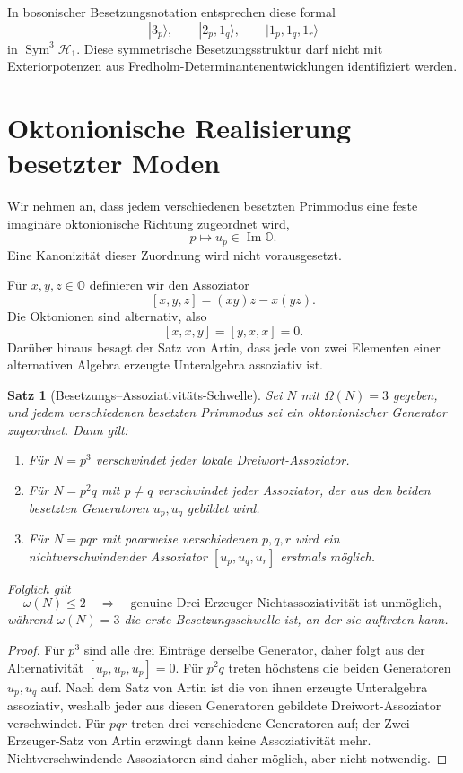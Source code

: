 \documentclass[11pt,a4paper]{article}
\newtheorem{theorem}{Satz}[section]
\theoremstyle{definition}
\theoremstyle{remark}
\newcommand{\OO}{\mathbb O}
\newcommand{\Sym}{\operatorname{Sym}}
\begin{document}
In bosonischer Besetzungsnotation entsprechen diese formal
\[
|3_p\rangle,\qquad |2_p,1_q\rangle,\qquad |1_p,1_q,1_r\rangle
\]
in $\Sym^3\mathcal H_1$. Diese symmetrische Besetzungsstruktur darf nicht mit Exteriorpotenzen aus Fredholm-Determinantenentwicklungen identifiziert werden.

\section{Oktonionische Realisierung besetzter Moden}
Wir nehmen an, dass jedem verschiedenen besetzten Primmodus eine feste imaginäre oktonionische Richtung zugeordnet wird,
\[
p\longmapsto u_p\in\operatorname{Im}\OO.
\]
Eine Kanonizität dieser Zuordnung wird nicht vorausgesetzt.

Für $x,y,z\in\OO$ definieren wir den Assoziator
\[
[x,y,z]=(xy)z-x(yz).
\]
Die Oktonionen sind alternativ, also
\[
[x,x,y]=[y,x,x]=0.
\]
Darüber hinaus besagt der Satz von Artin, dass jede von zwei Elementen einer alternativen Algebra erzeugte Unteralgebra assoziativ ist.

\begin{theorem}[Besetzungs--Assoziativitäts-Schwelle]\label{thm:threshold}
Sei $N$ mit $\Omega(N)=3$ gegeben, und jedem verschiedenen besetzten Primmodus sei ein oktonionischer Generator zugeordnet. Dann gilt:
\begin{enumerate}[label=(\roman*)]
\item Für $N=p^3$ verschwindet jeder lokale Dreiwort-Assoziator.
\item Für $N=p^2q$ mit $p\ne q$ verschwindet jeder Assoziator, der aus den beiden besetzten Generatoren $u_p,u_q$ gebildet wird.
\item Für $N=pqr$ mit paarweise verschiedenen $p,q,r$ wird ein nichtverschwindender Assoziator $[u_p,u_q,u_r]$ erstmals möglich.
\end{enumerate}
Folglich gilt
\[
\omega(N)\le2
\quad\Longrightarrow\quad
\text{genuine Drei-Erzeuger-Nichtassoziativität ist unmöglich},
\]
während $\omega(N)=3$ die erste Besetzungsschwelle ist, an der sie auftreten kann.
\end{theorem}

\begin{proof}
Für $p^3$ sind alle drei Einträge derselbe Generator, daher folgt aus der Alternativität $[u_p,u_p,u_p]=0$. Für $p^2q$ treten höchstens die beiden Generatoren $u_p,u_q$ auf. Nach dem Satz von Artin ist die von ihnen erzeugte Unteralgebra assoziativ, weshalb jeder aus diesen Generatoren gebildete Dreiwort-Assoziator verschwindet. Für $pqr$ treten drei verschiedene Generatoren auf; der Zwei-Erzeuger-Satz von Artin erzwingt dann keine Assoziativität mehr. Nichtverschwindende Assoziatoren sind daher möglich, aber nicht notwendig.
\end{proof}
\end{document}
